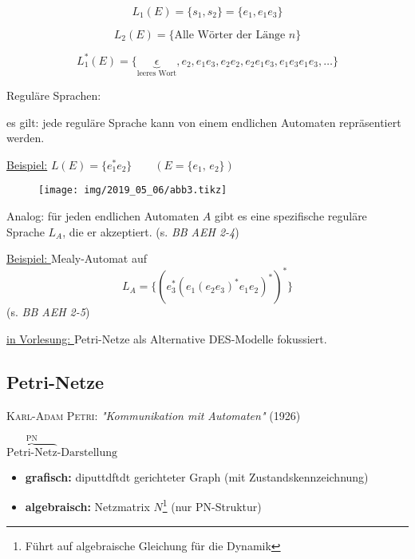 \begin{equation}
	L_1(E) = \{s_1, s_2\} = \{e_1, e_1 e_3\} 
\end{equation}

\begin{equation}
	L_2(E) = \{ \text{Alle Wörter der Länge } n \}
\end{equation}

\begin{equation}
	L_1^{\ast}(E) = \{ \underbrace{\epsilon}_\text{leeres Wort}, e_2, e_1 e_3, e_2 e_2, e_2 e_1 e_3, e_1 e_3 e_1 e_3, \ldots \}
\end{equation}

Reguläre Sprachen: 

es gilt: jede reguläre Sprache kann von einem endlichen Automaten repräsentiert werden.

\underline{Beispiel:} $L(E) = \{e_1^{\ast} e_2\} \qquad (E=\{e_1,\,e_2\})$

\begin{figure}[H]
	\centering
	\texttt{[image: img/2019\_05\_06/abb3.tikz]}
\end{figure}

Analog: für jeden endlichen Automaten $A$ gibt es eine spezifische reguläre Sprache $L_A$, die er akzeptiert. (s. \textit{BB AEH 2-4})

\underline{Beispiel: } Mealy-Automat auf 
\begin{equation}
	L_A = \{ (e_3^{\ast}(e_1 (e_2 e_3)^{\ast} e_1 e_2)^{\ast})^{\ast} \}
\end{equation}
(s. \textit{BB AEH 2-5})

\underline{in Vorlesung: } Petri-Netze als Alternative DES-Modelle fokussiert.



\subsection{Petri-Netze}
\textsc{Karl-Adam Petri}: \textit{"Kommunikation mit Automaten"} (1926)

\underline{$\overbrace{\text{Petri-Netz}}^{\text{PN}}\text{-Darstellung}$}

\begin{itemize}
	\item \textbf{grafisch:} diputtdftdt gerichteter Graph (mit Zustandskennzeichnung)
	\item \textbf{algebraisch:} Netzmatrix $N$\footnote{Führt auf algebraische Gleichung für die Dynamik} (nur PN-Struktur) 
\end{itemize}

